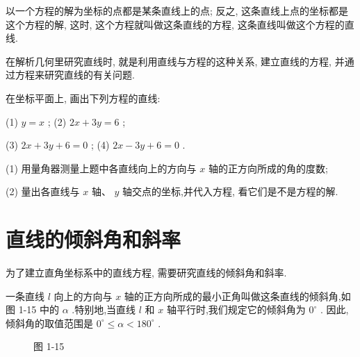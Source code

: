 \documentclass[lang=cn,newtx,12pt,scheme=chinese]{elegantbook}
\begin{document}
\begin{corollary}[直线与方程的关系]
以一个方程的解为坐标的点都是某条直线上的点; 反之, 这条直线上点的坐标都是这个方程的解, 这时, 这个方程就叫做这条直线的方程, 这条直线叫做这个方程的直线.
\end{corollary}

在解析几何里研究直线时, 就是利用直线与方程的这种关系, 建立直线的方程, 并通过方程来研究直线的有关问题.

\begin{problemset}[练习]

\item 在坐标平面上, 画出下列方程的直线:

(1) \(y = x\) ; (2) \({2x} + {3y} = 6\) ;

(3) \({2x} + {3y} + 6 = 0\) ; (4) \({2x} - {3y} + 6 = 0\) .

\item (1) 用量角器测量上题中各直线向上的方向与 \(x\) 轴的正方向所成的角的度数;

(2) 量出各直线与 \(x\) 轴、 \(y\) 轴交点的坐标,并代入方程, 看它们是不是方程的解.
\end{problemset}

\section{直线的倾斜角和斜率}

为了建立直角坐标系中的直线方程, 需要研究直线的倾斜角和斜率.

\begin{definition}[倾斜角]
一条直线 \(l\) 向上的方向与 \(x\) 轴的正方向所成的最小正角叫做这条直线的倾斜角,如图 1-15 中的 \(\alpha\) .特别地,当直线 \(l\) 和 \(x\) 轴平行时,我们规定它的倾斜角为 \({0}^{ \circ }\) . 因此,倾斜角的取值范围是 \({0}^{ \circ } \leq \alpha < {180}^{ \circ }\) .
\end{definition}

\begin{figure}[h]
	\centering
	\begin{subfigure}[h]{0.45\textwidth}
		\centering
		
	\end{subfigure}
	\hfill %
	\begin{subfigure}[h]{0.45\textwidth}
		\centering
		
	\end{subfigure}
	\caption{图 1-15}
\end{figure}
\end{document}
